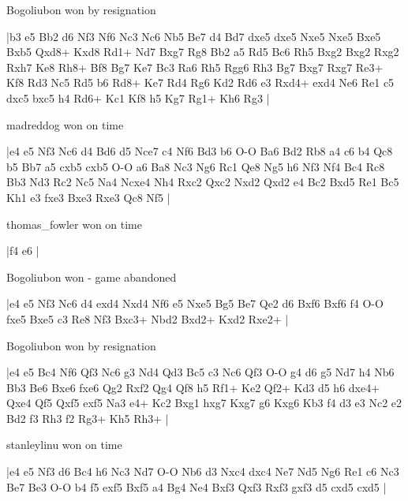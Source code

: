 \showboard

Bogoliubon won by resignation

\makegametitle
|b3 e5 Bb2 d6 Nf3 Nf6 Nc3 Nc6 Nb5 Be7 d4 Bd7 dxe5 dxe5 Nxe5 Nxe5 Bxe5 Bxb5 Qxd8+ Kxd8 Rd1+ Nd7 Bxg7 Rg8 Bb2 a5 Rd5 Bc6 Rh5 Bxg2 Bxg2 Rxg2 Rxh7 Ke8 Rh8+ Bf8 Bg7 Ke7 Bc3 Ra6 Rh5 Rgg6 Rh3 Bg7 Bxg7 Rxg7 Re3+ Kf8 Rd3 Nc5 Rd5 b6 Rd8+ Ke7 Rd4 Rg6 Kd2 Rd6 e3 Rxd4+ exd4 Ne6 Re1 c5 dxc5 bxc5 h4 Rd6+ Kc1 Kf8 h5 Kg7 Rg1+ Kh6 Rg3  |

\showboard

madreddog won on time

\makegametitle
|e4 e5 Nf3 Nc6 d4 Bd6 d5 Nce7 c4 Nf6 Bd3 b6 O-O Ba6 Bd2 Rb8 a4 c6 b4 Qc8 b5 Bb7 a5 cxb5 cxb5 O-O a6 Ba8 Nc3 Ng6 Rc1 Qe8 Ng5 h6 Nf3 Nf4 Bc4 Rc8 Bb3 Nd3 Rc2 Nc5 Na4 Ncxe4 Nh4 Rxc2 Qxc2 Nxd2 Qxd2 e4 Bc2 Bxd5 Re1 Bc5 Kh1 e3 fxe3 Bxe3 Rxe3 Qc8 Nf5  |

\showboard

thomas\_fowler won on time

\makegametitle
|f4 e6  |

\showboard

Bogoliubon won - game abandoned

\makegametitle
|e4 e5 Nf3 Nc6 d4 exd4 Nxd4 Nf6 e5 Nxe5 Bg5 Be7 Qe2 d6 Bxf6 Bxf6 f4 O-O fxe5 Bxe5 c3 Re8 Nf3 Bxc3+ Nbd2 Bxd2+ Kxd2 Rxe2+  |

\showboard

Bogoliubon won by resignation

\makegametitle
|e4 e5 Bc4 Nf6 Qf3 Nc6 g3 Nd4 Qd3 Bc5 c3 Nc6 Qf3 O-O g4 d6 g5 Nd7 h4 Nb6 Bb3 Be6 Bxe6 fxe6 Qg2 Rxf2 Qg4 Qf8 h5 Rf1+ Ke2 Qf2+ Kd3 d5 h6 dxe4+ Qxe4 Qf5 Qxf5 exf5 Na3 e4+ Kc2 Bxg1 hxg7 Kxg7 g6 Kxg6 Kb3 f4 d3 e3 Nc2 e2 Bd2 f3 Rh3 f2 Rg3+ Kh5 Rh3+  |

\showboard

stanleylinu won on time

\makegametitle
|e4 e5 Nf3 d6 Bc4 h6 Nc3 Nd7 O-O Nb6 d3 Nxc4 dxc4 Ne7 Nd5 Ng6 Re1 c6 Nc3 Be7 Be3 O-O b4 f5 exf5 Bxf5 a4 Bg4 Ne4 Bxf3 Qxf3 Rxf3 gxf3 d5 cxd5 cxd5  |

